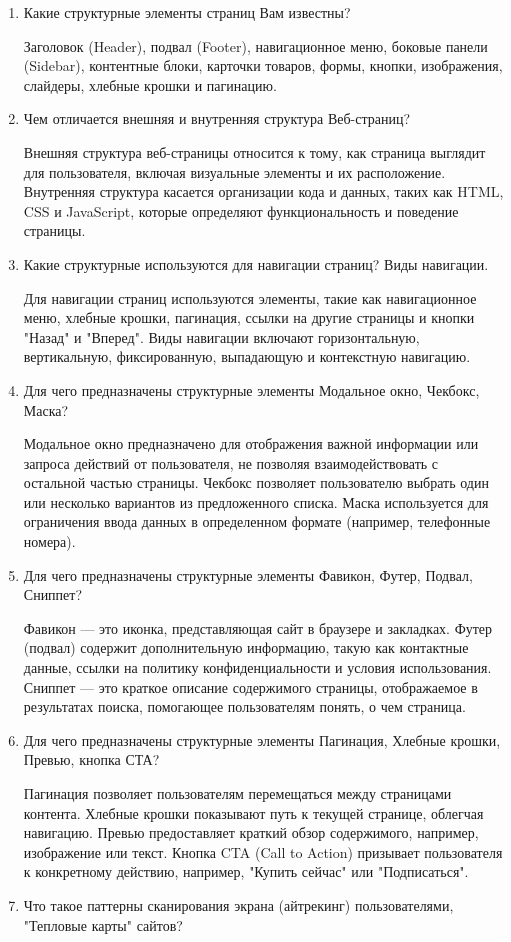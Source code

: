 \begin{enumerate}
    \item Какие структурные элементы страниц Вам известны?

    Заголовок (Header), подвал (Footer), навигационное меню, боковые панели (Sidebar), контентные блоки, карточки товаров, формы, кнопки, изображения, слайдеры, хлебные крошки и пагинацию.
    \item Чем отличается внешняя и внутренняя структура Веб-страниц?

    Внешняя структура веб-страницы относится к тому, как страница выглядит для пользователя, включая визуальные элементы и их расположение. Внутренняя структура касается организации кода и данных, таких как HTML, CSS и JavaScript, которые определяют функциональность и поведение страницы.
    \item Какие структурные используются для навигации страниц? Виды навигации.

    Для навигации страниц используются элементы, такие как навигационное меню, хлебные крошки, пагинация, ссылки на другие страницы и кнопки "Назад" и "Вперед". Виды навигации включают горизонтальную, вертикальную, фиксированную, выпадающую и контекстную навигацию.
    \item Для чего предназначены структурные элементы Модальное окно, Чекбокс, Маска?

    Модальное окно предназначено для отображения важной информации или запроса действий от пользователя, не позволяя взаимодействовать с остальной частью страницы. Чекбокс позволяет пользователю выбрать один или несколько вариантов из предложенного списка. Маска используется для ограничения ввода данных в определенном формате (например, телефонные номера).
    \item Для чего предназначены структурные элементы Фавикон, Футер, Подвал, Сниппет?

    Фавикон — это иконка, представляющая сайт в браузере и закладках. Футер (подвал) содержит дополнительную информацию, такую как контактные данные, ссылки на политику конфиденциальности и условия использования. Сниппет — это краткое описание содержимого страницы, отображаемое в результатах поиска, помогающее пользователям понять, о чем страница.
    \item Для чего предназначены структурные элементы Пагинация, Хлебные крошки, Превью, кнопка СТА?

    Пагинация позволяет пользователям перемещаться между страницами контента. Хлебные крошки показывают путь к текущей странице, облегчая навигацию. Превью предоставляет краткий обзор содержимого, например, изображение или текст. Кнопка CTA (Call to Action) призывает пользователя к конкретному действию, например, "Купить сейчас" или "Подписаться".
    \item Что такое паттерны сканирования экрана (айтрекинг) пользователями, "Тепловые карты" сайтов?


\end{enumerate}
